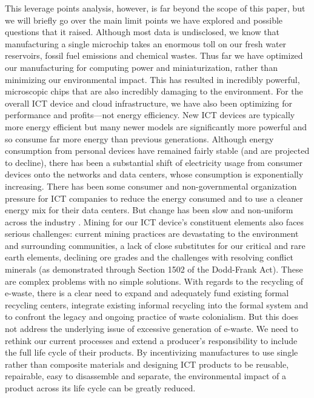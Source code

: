 \documentclass{article}
\begin{document}
This leverage points analysis, however, is far beyond the scope of this paper, but we will briefly go over the main limit points we have explored and possible questions that it raised. Although most data is undisclosed, we know that manufacturing a single microchip takes an enormous toll on our fresh water reservoirs, fossil fuel emissions and chemical wastes. Thus far we have optimized our manufacturing for computing power and miniaturization, rather than minimizing our environmental impact. This has resulted in incredibly powerful, microscopic chips that are also incredibly damaging to the environment. For the overall ICT device and cloud infrastructure, we have also been optimizing for performance and profits---not energy efficiency. New ICT devices are typically more energy efficient but many newer models are significantly more powerful and so consume far more energy than previous generations. Although energy consumption from personal devices have remained fairly stable (and are projected to decline), there has been a substantial shift of electricity usage from consumer devices onto the networks and data centers, whose consumption is exponentially increasing. There has been some consumer and non-governmental organization pressure for ICT companies to reduce the energy consumed and to use a cleaner energy mix for their data centers. But change has been slow and non-uniform across the industry \cite{jones2018stop}.
Mining for our ICT device's constituent elements also faces serious challenges: current mining practices are devastating to the environment and surrounding communities, a lack of close substitutes for our critical and rare earth elements, declining ore grades and the challenges with resolving conflict minerals (as demonstrated through Section 1502 of the Dodd-Frank Act). These are complex problems with no simple solutions. With regards to the recycling of e-waste, there is a clear need to expand and adequately fund existing formal recycling centers, integrate existing informal recycling into the formal system and to confront the legacy and ongoing practice of waste colonialism. But this does not address the underlying issue of excessive generation of e-waste. We need to rethink our current processes and extend a producer's responsibility to include the full life cycle of their products. By incentivizing manufactures to use single rather than composite materials and designing ICT products to be reusable, repairable, easy to disassemble and separate, the environmental impact of a product across its life cycle can be greatly reduced.
\end{document}
